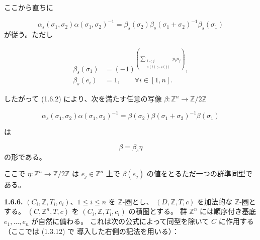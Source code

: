 \clearpage
{}%
ここから直ちに

\begin{equation*}
  \alpha_s(\sigma_1,\sigma_2)\alpha(\sigma_1,\sigma_2)^{-1}
  =\beta_s(\sigma_2)\beta_s(\sigma_1+\sigma_2)^{-1}\beta_s(\sigma_1)
\end{equation*}
が従う。ただし

\begin{equation}
  \begin{aligned}
    \beta_s(\sigma_1)
      &=(-1)^{\left(
          \sum_{\substack{i<j\\s(i)>s(j)}}p_i p_j
        \right)},\\
    \beta_s(e_i)&=1,
      \qquad \forall i\in[1,n].
  \end{aligned}
  \tag{1.6.5.3}
\end{equation}

したがって (1.6.2) により、次を満たす任意の写像
$\beta\colon\mathbb Z^n\to\mathbb Z/2\mathbb Z$

\begin{equation}
  \alpha_s(\sigma_1,\sigma_2)\alpha(\sigma_1,\sigma_2)^{-1}
  =\beta(\sigma_2)\beta(\sigma_1+\sigma_2)^{-1}\beta(\sigma_1)
  \tag{1.6.5.4}
\end{equation}

は

\begin{equation}
  \beta=\beta_s\eta
  \tag{1.6.5.5}
\end{equation}
の形である。

ここで $\eta\colon\mathbb Z^n\to\mathbb Z/2\mathbb Z$ は
$e_j\in\mathbb Z^n$ 上で $\beta(e_j)$ の値をとるただ一つの群準同型である。

\noindent\textbf{1.6.6.}\quad
$(C_i,\mathbb Z,T_i,c_i)$、$1\leq i\leq n$ を $\mathbb Z$-圏とし、
$(D,\mathbb Z,T,c)$ を加法的な $\mathbb Z$-圏とする。
$(C,\mathbb Z^n,T,c)$ を $(C_i,\mathbb Z,T_i,c_i)$ の積圏とする。
群 $\mathbb Z^n$ には順序付き基底 $e_1,\ldots,e_n$ が自然に備わる。
これは次の公式によって同型を除いて $C$ に作用する（ここでは (1.3.12) で
導入した右側の記法を用いる）：

